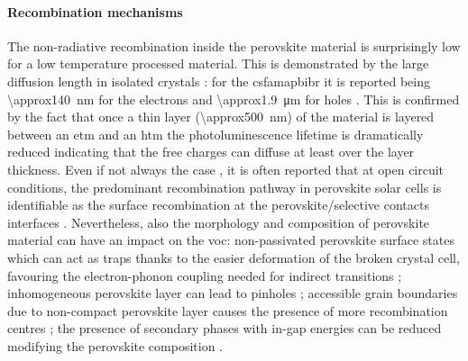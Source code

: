 	\paragraph{Recombination mechanisms}\label{intro_prv_recombination}
	The non-radiative recombination inside the perovskite material is surprisingly low for a low temperature processed material.
	This is demonstrated by the large diffusion length in isolated crystals \cite{Wehrenfennig2014,Wehrenfennig2014a,Stranks2013,Xing2013,Shi2015a,Eperon2014}: for the \gls{csfamapbibr} it is reported being \SI{\approx140}{\nm} for the electrons and \SI{\approx1.9}{\um} for holes \cite{Liu2017}.
	This is confirmed by the fact that once a thin layer (\SI{\approx500}{\nm}) of the material is layered between an \gls{etm} and an \gls{htm} the photoluminescence lifetime is dramatically reduced \cite{Jimenez-Lopez2017,Eperon2014} indicating that the free charges can diffuse at least over the layer thickness.
	Even if not always the case \cite{Valadez-Villalobos2019,Tress2018}, it is often reported that at open circuit conditions, the predominant recombination pathway in perovskite solar cells is identifiable as the surface recombination at the perovskite/selective contacts interfaces \cite{Calado2018b,Stolterfoht2018a,Stolterfoht2018,Gelmetti2019,Shao2016,Correa-Baena2017,Hou2016}.
	Nevertheless, also the morphology and composition of perovskite material can have an impact on the \gls{voc}: non-passivated perovskite surface states which can act as traps \cite{Zheng2017} thanks to the easier deformation of the broken crystal cell, favouring the electron-phonon coupling needed for indirect transitions \cite{Wu2015}; inhomogeneous perovskite layer can lead to pinholes \cite{Lee2015,Montcada2017,Qiu2016}; accessible grain boundaries due to non-compact perovskite layer causes the presence of more recombination centres \cite{Shao2016a}; the presence of secondary phases with in-gap energies can be reduced modifying the perovskite composition \cite{Bi2016}.

